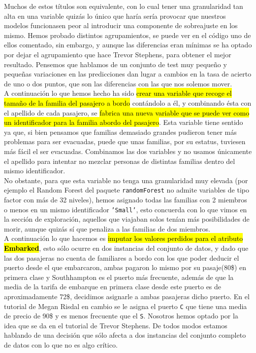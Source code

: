 \documentclass[10pt,a4paper]{article}
\newcommand{\emp}[1]{\sethlcolor{light-yellow}\hl{#1}} %
\newcommand{\code}[1]{\textcolor{rblue}{\texttt{#1}}} %
\begin{document}
Muchos de estos títulos son equivalente, con lo cual tener una granularidad tan alta en una variable quizás lo único que haría sería provocar que nuestros modelos funcionasen peor al introducir una componente de sobreajuste en los mismo. Hemos probado distintos agrupamientos, se puede ver en el código uno de ellos comentado, sin embargo, y aunque las diferencias eran mínimas se ha optado por dejar el agrupamiento que hace Trevor Stephens, para obtener el mejor resultado. Pensemos que hablamos de un conjunto de test muy pequeño y pequeñas variaciones en las predicciones dan lugar a cambios en la tasa de acierto de uno o dos puntos, que son las diferencias con las que nos solemos mover.\\

A continuación lo que hemos hecho ha sido \emp{crear una variable que recoge el tamaño de la familia del pasajero a bordo} contándolo a él, y combinando ésta con el apellido de cada pasajero, se \emp{fabrica una nueva variable que se puede ver como un identificador para la familia abordo del pasajero}. Esta variable tiene sentido ya que, si bien pensamos que familias demasiado grandes pudieron tener más problemas para ser evacuadas, puede que unas familias, por su estatus, tuviesen más fácil el ser evacuadas. Combinamos las dos variables y no usamos únicamente el apellido para intentar no mezclar personas de distintas familias dentro del mismo identificador.\\

No obstante, para que esta variable no tenga una granularidad muy elevada (por ejemplo el Random Forest del paquete \code{randomForest} no admite variables de tipo factor con más de 32 niveles), hemos asignado todas las familias con 2 miembros o menos en un mismo identificador \code{'Small'}, esto concuerda con lo que vimos en la sección de exploración, aquellos que viajaban solos tenían más posibilidades de morir, aunque quizás sí que penaliza a las familias de dos miembros.\\

A continuación lo que hacemos es \emp{imputar los valores perdidos para el atributo \textbf{Embarked}}, esto sólo ocurre en dos instancias del conjunto de datos, y dado que las dos pasajeras no cuenta de familiares a bordo con los que poder deducir el puerto desde el que embarcaron, ambas pagaron lo mismo por su pasaje(80\$) en primera clase y Southhampton es el puerto más frecuente, además de que la media de la tarifa de embarque en primera clase desde este puerto es de aproximadamente 72\$, decidimos asignarle a ambas pasajeras dicho puerto. En el tutorial de Megan Risdal en cambio se le asigna el puerto \code{C} que tiene una media de precio de 90\$ y es menos frecuente que el \code{S}. Nosotros hemos optado por la idea que se da en el tutorial de Trevor Stephens. De todos modos estamos hablando de una decisión que sólo afecta a dos instancias del conjunto completo de datos con lo que no es algo crítico.\\
\end{document}
